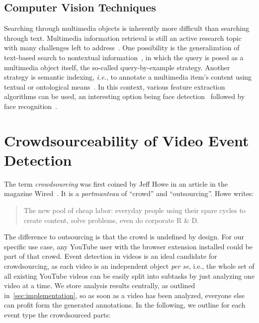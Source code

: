\documentclass[runningheads,a4paper]{llncs}
\begin{document}
\subsection{Computer Vision Techniques}
Searching through multimedia objects is inherently more difficult than searching through text.
Multimedia information retrieval is still an active research topic with many challenges left to address~\cite{Hanjalic:2008}.
One possibility is the generalization of text-based search to nontextual information~\cite{Sivic:2008}, in which the query is posed as a multimedia object itself, the so-called query-by-example strategy.
Another strategy is semantic indexing, \emph{i.e.}, to annotate a multimedia item's content using textual or ontological means~\cite{Hauptmann:2008}.
In this context, various feature extraction algorithms can be used, an interesting option being face detection~\cite{ViolaJones} followed by face recognition~\cite{Verstockt:2009}.

\section{Crowdsourceability of Video Event Detection} \label{sec:crowdsourcing}
The term \emph{crowdsourcing} was first coined by Jeff Howe in an article in the magazine Wired~\cite{crowdsourcing}. It is a \textit{portmanteau} of ``crowd'' and ``outsourcing''. Howe writes:

\begin{quotation}
  The new pool of cheap labor: everyday people using their spare cycles to create content, solve problems, even do corporate R \& D.
\end{quotation}

The difference to outsourcing is that the crowd is undefined by design. For our specific use case, any YouTube user with the browser extension installed could be part of that crowd. Event detection in videos is an ideal candidate for crowdsourcing, as each video is an independent object \textit{per se}, i.e., the whole set of all existing YouTube videos can be easily split into subtasks by just analyzing one video at a time. We store analysis results centrally, as outlined in~\autoref{sec:implementation}, so as soon as a video has been analyzed, everyone else can profit form the generated annotations. In the following, we outline for each event type the crowdsourced parts:
\end{document}
